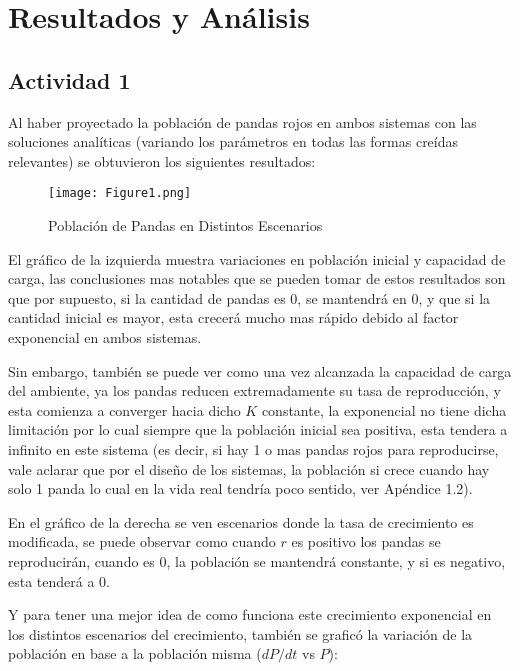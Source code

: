 \documentclass{article}
\begin{document}
\section*{Resultados y Análisis}



\subsection*{Actividad 1}
\noindent Al haber proyectado la población de pandas rojos en ambos sistemas con las soluciones analíticas (variando los parámetros en todas las formas creídas relevantes) se obtuvieron los siguientes resultados:

\begin{figure}[ht]
    \centering
    \caption{Población de Pandas en Distintos Escenarios}
    \texttt{[image: Figure1.png]}
    \label{fig:Image 1.1}
\end{figure}

\noindent El gráfico de la izquierda muestra variaciones en población inicial y capacidad de carga, las conclusiones mas notables que se pueden tomar de estos resultados son que por supuesto, si la cantidad de pandas es 0, se mantendrá en 0, y que si la cantidad inicial es mayor, esta crecerá mucho mas rápido debido al factor exponencial en ambos sistemas.\vspace{1\baselineskip}

\noindent Sin embargo, también se puede ver como una vez alcanzada la capacidad de carga del ambiente, ya los pandas reducen extremadamente su tasa de reproducción, y esta comienza a converger hacia dicho $K$ constante, la exponencial no tiene dicha limitación por lo cual siempre que la población inicial sea positiva, esta tendera a infinito en este sistema (es decir, si hay 1 o mas pandas rojos para reproducirse, vale aclarar que por el diseño de los sistemas, la población si crece cuando hay solo 1 panda lo cual en la vida real tendría poco sentido, ver Apéndice 1.2). \vspace{1\baselineskip}

\noindent En el gráfico de la derecha se ven escenarios donde la tasa de crecimiento es modificada, se puede observar como cuando $r$ es positivo los pandas se reproducirán, cuando es 0, la población se mantendrá constante, y si es negativo, esta tenderá a 0. 

\vspace{1\baselineskip}

\noindent Y para tener una mejor idea de como funciona este crecimiento exponencial en los distintos escenarios del crecimiento, también se graficó la variación de la población en base a la población misma ($dP/dt$ vs $P$):
\end{document}
